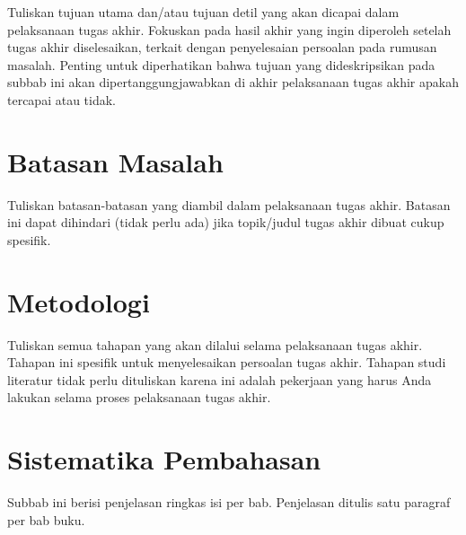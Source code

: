 Tuliskan tujuan utama dan/atau tujuan detil yang akan dicapai dalam pelaksanaan tugas akhir. Fokuskan pada hasil akhir yang ingin diperoleh setelah tugas akhir diselesaikan, terkait dengan penyelesaian persoalan pada rumusan masalah. Penting untuk diperhatikan bahwa tujuan yang dideskripsikan pada subbab ini akan dipertanggungjawabkan di akhir pelaksanaan tugas akhir apakah tercapai atau tidak.

\section{Batasan Masalah}

Tuliskan batasan-batasan yang diambil dalam pelaksanaan tugas akhir. Batasan ini dapat dihindari (tidak perlu ada) jika topik/judul tugas akhir dibuat cukup spesifik.

\section{Metodologi}

Tuliskan semua tahapan yang akan dilalui selama pelaksanaan tugas akhir. Tahapan ini spesifik untuk menyelesaikan persoalan tugas akhir. Tahapan studi literatur tidak perlu dituliskan karena ini adalah pekerjaan yang harus Anda lakukan selama proses pelaksanaan tugas akhir.

\section{Sistematika Pembahasan}

Subbab ini berisi penjelasan ringkas isi per bab. Penjelasan ditulis satu paragraf per bab buku.
